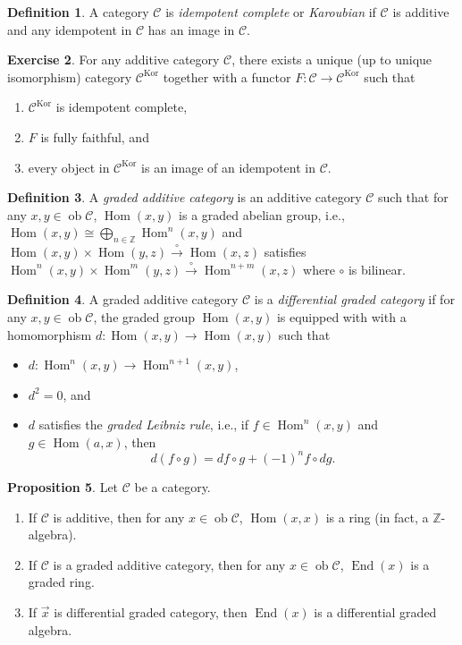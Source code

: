 \documentclass[10pt,letterpaper,cm]{nupset}
\theoremstyle{definition}
\newtheorem{definition}{Definition}[subsection]
\theoremstyle{theorem}
\newtheorem{prop}[definition]{Proposition}
\newtheorem{exercise}[definition]{Exercise}
\theoremstyle{remark}
\newcommand{\Z}{\mathbb Z}
\newcommand{\1}{\mathbf{1}}
\renewcommand{\c}{\mathscr{C}}
\newcommand{\x}{\vec x}
\newcommand{\0}{\vec 0}
\DeclareMathOperator{\ed}{End}
\DeclareMathOperator{\ob}{ob}
\DeclareMathOperator{\Hom}{Hom}
\DeclareMathOperator{\kor}{Kor}
\begin{document}
\begin{definition}
A category $\c$ is \textit{idempotent complete} or \textit{Karoubian} if $\c$ is additive and any idempotent in $\c$ has an image in $\c$.
\end{definition}

\begin{exercise}
For any additive category $\c$, there exists a unique (up to unique isomorphism) category $\c^{\kor}$ together with a functor $F : \c \to \c^{\kor}$ such that 
\begin{enumerate}
\item $\c^{\kor}$ is idempotent complete,
\item $F$ is fully faithful, and
\item every object in $\c^{\kor}$  is an image of an idempotent in $\c$.
\end{enumerate}
\end{exercise}

\begin{definition}
A \textit{graded additive category} is an additive category $\c$ such that for any $x,y \in \ob{\c}$, $\Hom(x,y)$ is a graded abelian group, i.e., $\Hom(x,y) \cong \bigoplus_{n \in \Z} \Hom^n(x,y)$ and $\Hom(x,y) \times \Hom(y,z) \overset{\circ}{\longrightarrow} \Hom(x,z)$ satisfies $\Hom^n(x,y) \times \Hom^m(y,z) \overset{\circ}{\longrightarrow} \Hom^{n+m}(x,z)$ where $\circ$ is bilinear. 
\end{definition}

\begin{definition}
A graded additive category $\c$ is a \textit{differential graded category} if for any $x,y \in \ob{\c}$, the graded group $\Hom(x,y)$ is equipped with with a homomorphism $d : \Hom(x,y) \to \Hom(x,y)$ such that
\begin{itemize}
\item $d : \Hom^n(x,y) \to \Hom^{n+1}(x,y)$,
\item $d^2 =0$, and
\item $d$ satisfies the \textit{graded Leibniz rule}, i.e., if $f \in \Hom^n(x,y)$ and $g \in \Hom(a,x)$, then $$  d(f\circ g) = df\circ g +({-}1)^nf \circ dg  .$$
\end{itemize}
\end{definition}

\begin{prop} Let $\c$ be a category.
\begin{enumerate}
\item If $\c$ is additive, then for any $x\in \ob{\c}$, $\Hom(x,x)$ is a ring (in fact, a $\Z$-algebra).
\item If $\c$ is a graded additive category, then for any $x\in \ob{\c}$, $\ed(x)$ is a graded ring.
\item If $\x$ is differential graded category, then $\ed(x)$ is a differential graded algebra.
\end{enumerate}
\end{prop}
\end{document}

